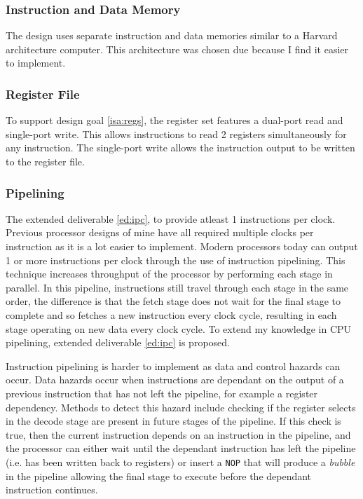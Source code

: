 \documentclass[11pt,a4paper]{report}
\begin{document}
{\subsubsection{Instruction and Data Memory}
The design uses separate instruction and data memories similar to a Harvard architecture computer. This architecture was chosen due because I find it easier to implement.

\subsubsection{Register File}
To support design goal \ref{isa:regs}, the register set features a dual-port read and single-port write. This allows instructions to read 2 registers simultaneously for any instruction. The single-port write allows the instruction output to be written to the register file. 

\subsubsection{Pipelining}
The extended deliverable \ref{ed:ipc}, to provide atleast 1 instructions per clock. Previous processor designs of mine have all required multiple clocks per instruction as it is a lot easier to implement. Modern processors today can output 1 or more instructions per clock through the use of instruction pipelining. This technique increases throughput of the processor by performing each stage in parallel. In this pipeline, instructions still travel through each stage in the same order, the difference is that the  fetch stage does not wait for the final stage to complete and so fetches a new instruction every clock cycle, resulting in each stage operating on new data every clock cycle. To extend my knowledge in CPU pipelining, extended deliverable \ref{ed:ipc} is proposed.

Instruction pipelining is harder to implement as data and control hazards can occur. Data hazards occur when instructions  are dependant on the output of a previous instruction that has not left the pipeline, for example a register dependency. Methods to detect this hazard include checking if the register selects in the decode stage are present in future stages of the pipeline. If this check is true, then the current instruction depends on an instruction in the pipeline, and the processor can  either wait until the dependant instruction has left the pipeline (i.e. has been written back to registers) or insert a \verb|NOP| that will produce a \textit{bubble} in the pipeline allowing the final stage to execute before the dependant instruction continues.

}
\end{document}
